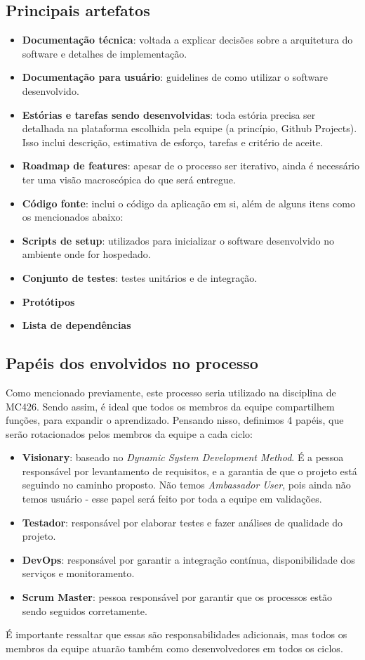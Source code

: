 \documentclass[12pt]{article}
\begin{document}
\subsection*{Principais artefatos}
\begin{itemize}
	\item \textbf{Documentação técnica}: voltada a explicar decisões sobre a arquitetura do software e detalhes de implementação.
	\item \textbf{Documentação para usuário}: guidelines de como utilizar o software desenvolvido.
	\item \textbf{Estórias e tarefas sendo desenvolvidas}: toda estória precisa ser detalhada na plataforma escolhida pela equipe (a princípio, Github Projects). Isso inclui descrição, estimativa de esforço, tarefas e critério de aceite.
	\item \textbf{Roadmap de features}: apesar de o processo ser iterativo, ainda é necessário ter uma visão macroscópica do que será entregue.
	\item \textbf{Código fonte}: inclui o código da aplicação em si, além de alguns itens como os mencionados abaixo:
	\item \textbf{Scripts de setup}: utilizados para inicializar o software desenvolvido no ambiente onde for hospedado.
	\item \textbf{Conjunto de testes}: testes unitários e de integração.
	\item \textbf{Protótipos}
	\item \textbf{Lista de dependências}
\end{itemize}


\subsection*{Papéis dos envolvidos no processo}

Como mencionado previamente, este processo seria utilizado na disciplina de MC426. Sendo assim, é ideal que todos os membros da equipe compartilhem funções, para expandir o aprendizado. Pensando nisso, definimos 4 papéis, que serão rotacionados pelos membros da equipe a cada ciclo:

\begin{itemize}
	\item \textbf{Visionary}: baseado no \textit{Dynamic System Development Method}. É a pessoa responsável por levantamento de requisitos, e a garantia de que o projeto está seguindo no caminho proposto. Não temos \textit{Ambassador User}, pois ainda não temos usuário - esse papel será feito por toda a equipe em validações.
	\item \textbf{Testador}: responsável por elaborar testes e fazer análises de qualidade do projeto.
	\item \textbf{DevOps}: responsável por garantir a integração contínua, disponibilidade dos serviços e monitoramento.
	\item \textbf{Scrum Master}: pessoa responsável por garantir que os processos estão sendo seguidos corretamente.
\end{itemize}

É importante ressaltar que essas são responsabilidades adicionais, mas todos os membros da equipe atuarão também como desenvolvedores em todos os ciclos.
\end{document}
